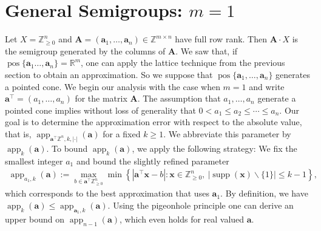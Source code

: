 \documentclass[pdflatex]{sn-jnl}
\DeclareMathOperator{\app}{app}
\DeclareMathOperator{\pos}{pos}
\DeclareMathOperator{\supp}{supp}
\newcommand{\R}{\mathbb{R}}
\newcommand{\Z}{\mathbb{Z}}
\newcommand{\bA}{\bm{A}}
\newcommand{\bx}{\bm{x}}
\newcommand{\ba}{\bm{a}}
\theoremstyle{thmstyleone}%
\theoremstyle{thmstyletwo}%
\theoremstyle{thmstylethree}%
\begin{document}
	\section{General Semigroups: $m=1$}
	Let $X = \Z^{n}_{\geq 0}$ and $\bA = (\ba_1,\ldots,\ba_n)\in\Z^{m\times n}$ have full row rank. Then $\bA\cdot X$ is the semigroup generated by the columns of $\bA$. We saw that, if $\pos\lbrace \ba_1\ldots,\ba_n\rbrace = \R^m$, 
	one can apply the lattice technique from the previous section to obtain an approximation. 
	So we suppose that $\pos\lbrace \ba_1,\ldots,\ba_n\rbrace$ generates a pointed cone. 
	We begin our analysis with the case when $m = 1$ and write $\ba^\top = (a_1,\ldots,a_n)$ for the matrix $\bA$. 
	The assumption that $a_1,\ldots,a_n$ generate a pointed cone implies without loss of generality that $0<a_1\leq a_2\leq\cdots\leq a_n$. 
	Our goal is to determine the approximation error with respect to the absolute value, that is, $\app_{\ba^\top\Z^n, k , |\cdot|}(\ba)$ for a fixed $k\geq 1$. We abbreviate this parameter by $\app_k(\ba)$. 
	To bound $\app_k(\ba)$, we apply the following strategy: We fix the smallest integer $a_1$ and bound the slightly refined parameter
	\begin{align*}
		\app_{a_1,k}(\ba) := \max_{b\in \ba^\top \Z^{n}_{\geq 0}}\min \left\lbrace \left| \ba^\top\bx - b\right| : \bx\in \Z^n_{\geq 0}, \ \left|\supp(\bx)\backslash \{1\}\right|\leq k - 1\right\rbrace,
	\end{align*}
	which corresponds to the best approximation that uses $\ba_1$. By definition, we have $\app_k(\ba)\leq \app_{\ba_1,k}(\ba)$. 
	Using the pigeonhole principle one can derive an upper bound on $\app_{n-1}(\ba)$, which even holds for real valued $\ba$. 
	
\end{document}
